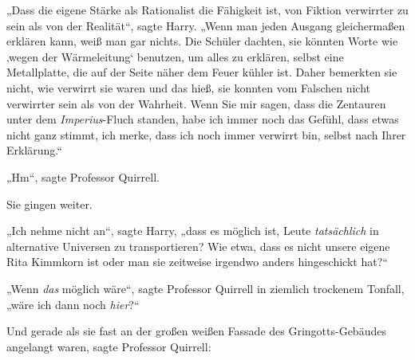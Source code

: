 „Dass die eigene Stärke als Rationalist die Fähigkeit ist, von Fiktion verwirrter zu sein als von der Realität“, sagte Harry.
„Wenn man jeden Ausgang gleichermaßen erklären kann, weiß man gar nichts. Die Schüler dachten, sie könnten Worte wie ‚wegen der Wärmeleitung‘ benutzen, um alles zu erklären, selbst eine Metallplatte, die auf der Seite näher dem Feuer kühler ist. Daher bemerkten sie nicht, wie verwirrt sie waren und das hieß, sie konnten vom Falschen nicht verwirrter sein als von der Wahrheit. Wenn Sie mir sagen, dass die Zentauren unter dem \emph{Imperius}-Fluch standen, habe ich immer noch das Gefühl, dass etwas nicht ganz stimmt, ich merke, dass ich noch immer verwirrt bin, selbst nach Ihrer Erklärung.“

„Hm“, sagte Professor Quirrell.

Sie gingen weiter.

„Ich nehme nicht an“, sagte Harry, „dass es möglich ist, Leute \emph{tatsächlich} in alternative Universen zu transportieren? Wie etwa, dass es nicht unsere eigene Rita Kimmkorn ist oder man sie zeitweise irgendwo anders hingeschickt hat?“

„Wenn \emph{das} möglich wäre“, sagte Professor Quirrell in ziemlich trockenem Tonfall, „wäre ich dann noch \emph{hier}?“

Und gerade als sie fast an der großen weißen Fassade des Gringotts-Gebäudes angelangt waren, sagte Professor Quirrell:

